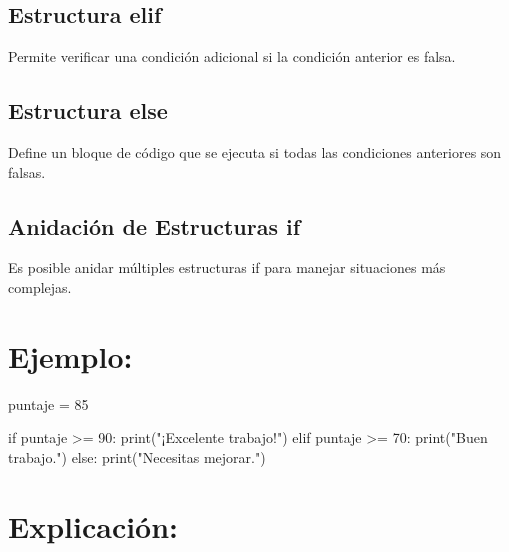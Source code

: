 \documentclass[
  a4paper,
  onepage,
  openany]{scrreprt}
\newenvironment{Shaded}{\begin{snugshade}}{\end{snugshade}}
\newcommand{\BuiltInTok}[1]{\textcolor[rgb]{0.00,0.23,0.31}{#1}}
\newcommand{\ControlFlowTok}[1]{\textcolor[rgb]{0.00,0.23,0.31}{#1}}
\newcommand{\DecValTok}[1]{\textcolor[rgb]{0.68,0.00,0.00}{#1}}
\newcommand{\NormalTok}[1]{\textcolor[rgb]{0.00,0.23,0.31}{#1}}
\newcommand{\OperatorTok}[1]{\textcolor[rgb]{0.37,0.37,0.37}{#1}}
\newcommand{\StringTok}[1]{\textcolor[rgb]{0.13,0.47,0.30}{#1}}
\begin{document}
\hypertarget{estructura-elif-1}{%
\subsection{Estructura elif}\label{estructura-elif-1}}

Permite verificar una condición adicional si la condición anterior es
falsa.

\hypertarget{estructura-else-1}{%
\subsection{Estructura else}\label{estructura-else-1}}

Define un bloque de código que se ejecuta si todas las condiciones
anteriores son falsas.

\hypertarget{anidaciuxf3n-de-estructuras-if-1}{%
\subsection{Anidación de Estructuras
if}\label{anidaciuxf3n-de-estructuras-if-1}}

Es posible anidar múltiples estructuras if para manejar situaciones más
complejas.

\hypertarget{ejemplo-31}{%
\section{Ejemplo:}\label{ejemplo-31}}

\begin{Shaded}
\begin{Highlighting}[]
\NormalTok{puntaje }\OperatorTok{=} \DecValTok{85}

\ControlFlowTok{if}\NormalTok{ puntaje }\OperatorTok{\textgreater{}=} \DecValTok{90}\NormalTok{:}
    \BuiltInTok{print}\NormalTok{(}\StringTok{"¡Excelente trabajo!"}\NormalTok{)}
\ControlFlowTok{elif}\NormalTok{ puntaje }\OperatorTok{\textgreater{}=} \DecValTok{70}\NormalTok{:}
    \BuiltInTok{print}\NormalTok{(}\StringTok{"Buen trabajo."}\NormalTok{)}
\ControlFlowTok{else}\NormalTok{:}
    \BuiltInTok{print}\NormalTok{(}\StringTok{"Necesitas mejorar."}\NormalTok{)}
\end{Highlighting}
\end{Shaded}

\hypertarget{explicaciuxf3n-31}{%
\section{Explicación:}\label{explicaciuxf3n-31}}
\end{document}
